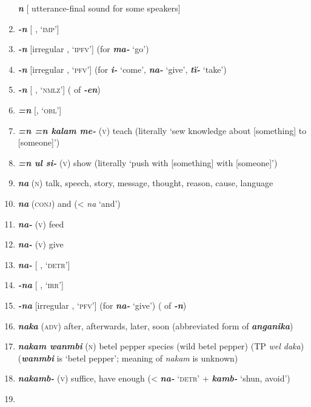 \begin{enumerate}[noitemsep, label={}, align=left, widest=190, labelsep=1ex,leftmargin=*,itemindent=-10pt]
\textbf{\textit{n}} [ utterance-final sound for some speakers] \item 
\textbf{\textit{-n}} [ , ‘\textsc{imp}’] \item 
\textbf{\textit{-n}} [irregular  , ‘\textsc{ipfv}’] (for \textbf{\textit{ma-}} ‘go’) \item 
\textbf{\textit{-n}} [irregular  , ‘\textsc{pfv}’] (for \textbf{\textit{i-}} ‘come’, \textbf{\textit{na-}} ‘give’, \textbf{\textit{tï-}} ‘take’) \item 
\textbf{\textit{-n}} [ , ‘\textsc{nmlz}’] ( of \textbf{\textit{-en}}) \item 
\textbf{\textit{=n}} [, ‘\textsc{obl}’] \item 
\textbf{\textit{=n =n kalam me-}} (\textsc{v}) teach (literally ‘sew knowledge about [something] to [someone]’) \item 
\textbf{\textit{=n ul si-}} (\textsc{v}) show (literally ‘push with [something] with [someone]’) \item 
\textbf{\textit{na}} (\textsc{n}) talk, speech, story, message, thought, reason, cause, language \item 
\textbf{\textit{na}} (\textsc{conj}) and (<  \textit{na} ‘and’) \item 
\textbf{\textit{na-}} (\textsc{v}) feed \item 
\textbf{\textit{na-}} (\textsc{v}) give \item 
\textbf{\textit{na-}} [ , ‘\textsc{detr}’] \item 
\textbf{\textit{-na}} [ , ‘\textsc{irr}’] \item 
\textbf{\textit{-na}} [irregular  , ‘\textsc{pfv}’] (for \textbf{\textit{na-}} ‘give’) ( of \textbf{\textit{-n}}) \item 
\textbf{\textit{naka}} (\textsc{adv}) after, afterwards, later, soon (abbreviated form of \textbf{\textit{anganika}}) \item 
\textbf{\textit{nakam wanmbi}} (\textsc{n}) betel pepper species (wild betel pepper) (TP \textit{wel daka}) (\textbf{\textit{wanmbi}} is ‘betel pepper’; meaning of \textit{nakam} is unknown) \item 
\textbf{\textit{nakamb-}} (\textsc{v}) suffice, have enough (< \textbf{\textit{na-}} ‘\textsc{detr}’ + \textbf{\textit{kamb-}} ‘shun, avoid’) \item 

\end{enumerate}
